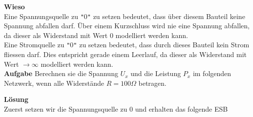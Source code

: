 					 \textbf{Wieso} \\
					 Eine Spannungsquelle zu \texttt{"}0\texttt{"} zu setzen bedeutet, dass über diesem Bauteil keine Spannung abfallen darf. Über einem Kurzschluss wird nie eine Spannung abfallen, da dieser als Widerstand mit Wert 0 modelliert werden kann. \\
					 Eine Stromquelle zu \texttt{"}0\texttt{"} zu setzen bedeutet, dass durch dieses Bauteil kein Strom fliessen darf. Dies entspricht gerade einem Leerlauf, da dieser als Widerstand mit Wert $\displaystyle \rightarrow \infty$ modelliert werden kann. \\


					 \beginip
						\textbf{Aufgabe} Berechnen sie die Spannung $U_x$ und die Leistung $P_x$ im folgenden Netzwerk, wenn alle Widerstände $ R = 100 \Omega$ betragen. \\
						\begin{center}
							\fix
						\end{center}
						\iend

						\beginip
						\textbf{Lösung}
						\\
						Zuerst setzen wir die Spannungsquelle zu 0 und erhalten das folgende ESB \\
						\begin{center}
							\fix
						\end{center}

